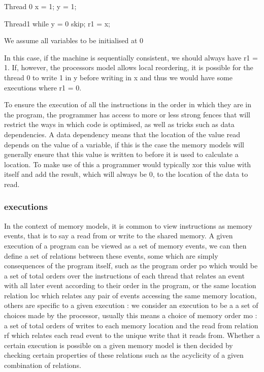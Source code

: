 \documentclass[a4,12pt]{article}
\begin{document}
Thread 0
x = 1;
y = 1;

Thread1
while y = 0 {
  skip;
}
r1 = x;

We assume all variables to be initialised at 0

In this case, if the machine is sequentially consistent, we should always have r1 = 1. 
If, however, the processors model allows local reordering, it is possible for the thread 0 to write 1 in y before writing in x and thus we would have some executions where r1 = 0.

To ensure the execution of all the instructions in the order in which they are in the program, the programmer has access to more or less strong fences that will restrict the ways in which code is optimised, as well as tricks such as data dependencies. A data dependency means that the location of the value read depends on the value of a variable, if this is the case the memory models will generally ensure that this value is written to before it is used to calculate a location. To make use of this a programmer would typically xor this value with itself and add the result, which will always be 0, to the location of the data to read.

\subsubsection{executions}

In the context of memory models, it is common to view instructions as memory events, that is to say a read from or write to the shared memory. A given execution of a program can be viewed as a set of memory events, we can then define a set of relations between these events, some which are simply consequences of the program itself, such as the program order po which would be a set of total orders over the instructions of each thread that relates an event with all later event according to their order in the program, or the same location relation loc which relates any pair of events accessing the same memory location, others are specific to a given execution : we consider an execution to be a a set of choices made by the processor, usually this means a choice of memory order mo : a set of total orders of writes to each memory location and the read from relation rf which relates each read event to the unique write that it reads from. Whether a certain execution is possible on a given memory model is then decided by checking certain properties of these relations such as the acyclicity of a given combination of relations.
\end{document}
